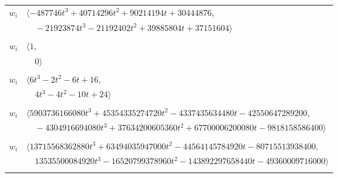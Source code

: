\documentclass[11pt]{article}
\begin{document}
\begin{longtable}{@{}ll@{}}
$w_i$ & $\langle -487746t^{3}+40714296t^{2}+90214194t+30444876,$\\
 & $\quad -21923874t^{3}-21192402t^{2}+39885804t+37151604\rangle$\\
\addlinespace[2pt]
\multicolumn{2}{@{}p{0.97\textwidth}@{}}{$i=28$, $D_i=1$, $\rho_{ij}$: $--$}\\
$w_i$ & $\langle 1,$\\
 & $\quad 0\rangle$\\
\addlinespace[2pt]
\multicolumn{2}{@{}p{0.97\textwidth}@{}}{$i=29$, $D_i=1$, $\rho_{ij}$: $3{:}1, \allowbreak 8{:}2, \allowbreak 19{:}1, \allowbreak 26{:}2, \allowbreak 37{:}1, \allowbreak 38{:}2, \allowbreak 56{:}2$}\\
$w_i$ & $\langle 6t^{3}-2t^{2}-6t+16,$\\
 & $\quad 4t^{3}-4t^{2}-10t+24\rangle$\\
\addlinespace[2pt]
\multicolumn{2}{@{}p{0.97\textwidth}@{}}{$i=30$, $D_i=1594323$, $e_i=2$, $\rho_{ij}$: $1{:}1, \allowbreak 4{:}1, \allowbreak 10{:}2, \allowbreak 16{:}2, \allowbreak 18{:}1, \allowbreak 19{:}2, \allowbreak 20{:}2, \allowbreak 26{:}2, \allowbreak 32{:}1, \allowbreak 39{:}1, \allowbreak 43{:}2, \allowbreak 61{:}1, \allowbreak 76{:}2, \allowbreak 77{:}2, \allowbreak 85{:}1, \allowbreak 87{:}1, \allowbreak 89{:}2$}\\
$w_i$ & $\langle 5903736166080t^{3}+45354335274720t^{2}-4337435634480t-42550647289200,$\\
 & $\quad -4304916694080t^{3}+37634200605360t^{2}+67700006200080t-9818158586400\rangle$\\
\addlinespace[2pt]
\multicolumn{2}{@{}p{0.97\textwidth}@{}}{$i=31$, $D_i=531441$, $e_i=1$, $\rho_{ij}$: $1{:}2, \allowbreak 4{:}2, \allowbreak 17{:}1, \allowbreak 18{:}1, \allowbreak 19{:}2, \allowbreak 22{:}1, \allowbreak 23{:}1, \allowbreak 27{:}1, \allowbreak 40{:}2, \allowbreak 43{:}2, \allowbreak 45{:}2, \allowbreak 47{:}1, \allowbreak 60{:}2, \allowbreak 69{:}1, \allowbreak 74{:}1, \allowbreak 82{:}2, \allowbreak 85{:}1$}\\
$w_i$ & $\langle 13715568362880t^{3}+63494035947000t^{2}-44564145784920t-80715513938400,$\\
 & $\quad 13535500084920t^{3}-16520799378960t^{2}-143892297658440t-49360009716000\rangle$\\
\addlinespace[2pt]
\multicolumn{2}{@{}p{0.97\textwidth}@{}}{$i=32$, $D_i=1$, $\rho_{ij}$: $6{:}1, \allowbreak 9{:}2, \allowbreak 11{:}1, \allowbreak 14{:}2, \allowbreak 20{:}1, \allowbreak 22{:}1, \allowbreak 26{:}2, \allowbreak 30{:}2, \allowbreak 35{:}1, \allowbreak 55{:}2, \allowbreak 60{:}1, \allowbreak 61{:}2$}\\

\end{longtable}
\end{document}
